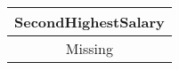 \begin{tabular}{|c|}
\hline
    \textbf{SecondHighestSalary}\\ \hline
    Missing \\ \hline
\end{tabular}
